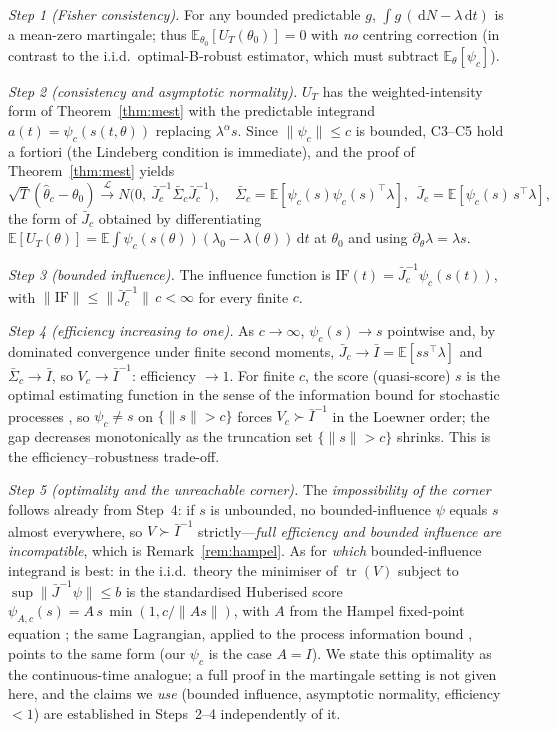 \documentclass[smallextended,natbib]{svjour3}
\newcommand{\dd}{\,\mathrm{d}}
\newcommand{\E}{\mathbb{E}}
\newcommand{\toL}{\xrightarrow{\mathcal{L}}}
\begin{document}
\emph{Step 1 (Fisher consistency).} For any bounded predictable $g$, $\int g\,(\dd N-\lambda\dd t)$
is a mean-zero martingale; thus $\E_{\theta_0}[U_T(\theta_0)]=0$ with \emph{no}
centring correction (in contrast to the i.i.d.\ optimal-B-robust estimator, which
must subtract $\E_\theta[\psi_c]$).

\emph{Step 2 (consistency and asymptotic normality).} $U_T$ has the weighted-intensity
form of Theorem~\ref{thm:mest} with the predictable integrand $a(t)=\psi_c(s(t,\theta))$
replacing $\lambda^\alpha s$. Since $\|\psi_c\|\le c$ is bounded, C3--C5 hold a
fortiori (the Lindeberg condition is immediate), and the proof of
Theorem~\ref{thm:mest} yields
\[
\sqrt T(\hat\theta_c-\theta_0)\toL N\!\big(0,\ \bar J_c^{-1}\bar\Sigma_c\bar J_c^{-1}\big),
\quad
\bar\Sigma_c=\E[\psi_c(s)\psi_c(s)^\top\lambda],\ \
\bar J_c=\E[\psi_c(s)\,s^\top\lambda],
\]
the form of $\bar J_c$ obtained by differentiating
$\E[U_T(\theta)]=\E\!\int\psi_c(s(\theta))(\lambda_0-\lambda(\theta))\dd t$ at $\theta_0$
and using $\partial_\theta\lambda=\lambda s$.

\emph{Step 3 (bounded influence).} The influence function is
$\mathrm{IF}(t)=\bar J_c^{-1}\psi_c(s(t))$, with $\|\mathrm{IF}\|\le\|\bar J_c^{-1}\|\,c<\infty$
for every finite $c$.

\emph{Step 4 (efficiency increasing to one).} As $c\to\infty$, $\psi_c(s)\to s$
pointwise and, by dominated convergence under finite second moments,
$\bar J_c\to\bar I=\E[ss^\top\lambda]$ and $\bar\Sigma_c\to\bar I$, so
$V_c\to\bar I^{-1}$: efficiency $\to1$. For finite $c$, the score (quasi-score) $s$ is
the optimal estimating function in the sense of the information bound for stochastic
processes \citep[i.i.d.\ bound]{godambe1960}\citep[process/martingale
version]{godambe1985,heyde1997}, so $\psi_c\neq s$ on $\{\|s\|>c\}$ forces
$V_c\succ\bar I^{-1}$ in the Loewner order; the gap decreases monotonically as the
truncation set $\{\|s\|>c\}$ shrinks. This is the efficiency--robustness trade-off.

\emph{Step 5 (optimality and the unreachable corner).} The \emph{impossibility of the
corner} follows already from Step~4: if $s$ is unbounded, no bounded-influence $\psi$
equals $s$ almost everywhere, so $V\succ\bar I^{-1}$ strictly---\emph{full efficiency
and bounded influence are incompatible}, which is Remark~\ref{rem:hampel}. As for
\emph{which} bounded-influence integrand is best: in the i.i.d.\ theory the minimiser
of $\operatorname{tr}(V)$ subject to $\sup\|\bar J^{-1}\psi\|\le b$ is the standardised
Huberised score $\psi_{A,c}(s)=A\,s\,\min(1,c/\|As\|)$, with $A$ from the Hampel
fixed-point equation \citep[Thm.~2.6]{hampel1986}; the same Lagrangian, applied to the
process information bound \citep{godambe1985,heyde1997}, points to the same form (our
$\psi_c$ is the case $A=I$). We state this optimality as the continuous-time analogue;
a full proof in the martingale setting is not given here, and the claims we \emph{use}
(bounded influence, asymptotic normality, efficiency $<1$) are established in
Steps~2--4 independently of it.
\end{document}
